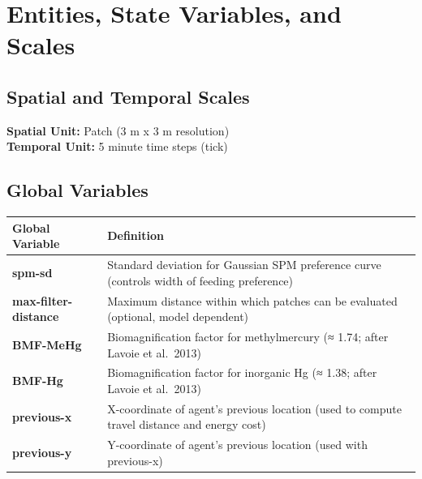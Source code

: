 \documentclass[
]{book}
\begin{document}
\section{Entities, State Variables, and Scales}\label{entities-state-variables-and-scales-5}

\subsection{Spatial and Temporal Scales}\label{spatial-and-temporal-scales-5}

\textbf{Spatial Unit:} Patch (3 m x 3 m resolution)\\
\textbf{Temporal Unit:} 5 minute time steps (tick)

\subsection{\texorpdfstring{\textbf{Global Variables}}{Global Variables}}\label{global-variables-5}

\begin{longtable}[]{@{}
  >{\raggedright\arraybackslash}p{}
  >{\raggedright\arraybackslash}p{}@{}}
\toprule\noalign{}
\begin{minipage}[b]{\linewidth}\raggedright
Global Variable
\end{minipage} & \begin{minipage}[b]{\linewidth}\raggedright
Definition
\end{minipage} \\
\midrule\noalign{}
\endhead
\bottomrule\noalign{}
\endlastfoot
\textbf{spm-sd} & Standard deviation for Gaussian SPM preference curve (controls width of feeding preference) \\
\textbf{max-filter-distance} & Maximum distance within which patches can be evaluated (optional, model dependent) \\
\textbf{BMF-MeHg} & Biomagnification factor for methylmercury (≈ 1.74; after Lavoie et al.~2013) \\
\textbf{BMF-Hg} & Biomagnification factor for inorganic Hg (≈ 1.38; after Lavoie et al.~2013) \\
\textbf{previous-x} & X-coordinate of agent's previous location (used to compute travel distance and energy cost) \\
\textbf{previous-y} & Y-coordinate of agent's previous location (used with previous-x) \\
\end{longtable}
\end{document}
